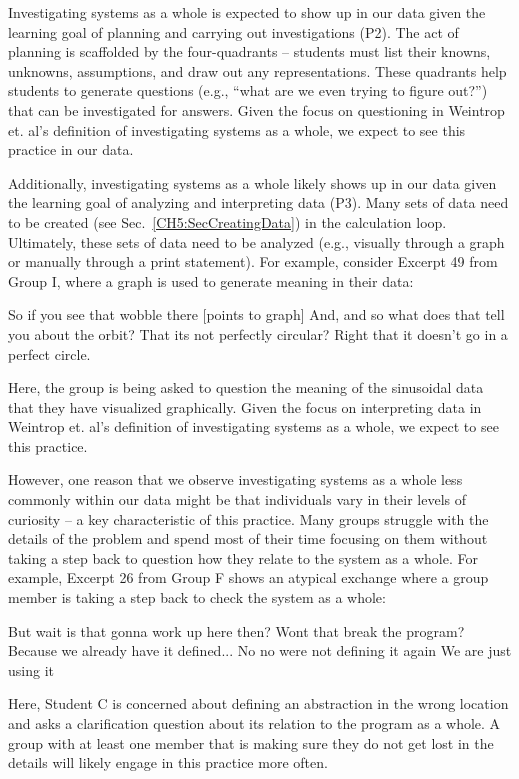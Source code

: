 \documentclass{msuphddissertation}
\begin{document}
\begin{doublespace}
Investigating systems as a whole is expected to show up in our data given the learning goal of planning and carrying out investigations (P2).  The act of planning is scaffolded by the four-quadrants -- students must list their knowns, unknowns, assumptions, and draw out any representations.  These quadrants help students to generate questions (e.g., ``what are we even trying to figure out?'') that can be investigated for answers.  Given the focus on questioning in Weintrop et. al's definition of investigating systems as a whole, we expect to see this practice in our data.

Additionally, investigating systems as a whole likely shows up in our data given the learning goal of analyzing and interpreting data (P3).  Many sets of data need to be created (see Sec.~\ref{CH5:SecCreatingData}) in the calculation loop.  Ultimately, these sets of data need to be analyzed (e.g., visually through a graph or manually through a print statement).  For example, consider Excerpt 49 from Group I, where a graph is used to generate meaning in their data:  \begin{description}
\TA So if you see that wobble there [points to graph]
\TA And, and so what does that tell you about the orbit?
\SB That its not perfectly circular?
\SC Right that it doesn't go in a perfect circle.
\end{description}  Here, the group is being asked to question the meaning of the sinusoidal data that they have visualized graphically.  Given the focus on interpreting data in Weintrop et. al's definition of investigating systems as a whole, we expect to see this practice.

However, one reason that we observe investigating systems as a whole less commonly within our data might be that individuals vary in their levels of curiosity -- a key characteristic of this practice.  Many groups struggle with the details of the problem and spend most of their time focusing on them without taking a step back to question how they relate to the system as a whole.  For example, Excerpt 26 from Group F shows an atypical exchange where a group member is taking a step back to check the system as a whole: \begin{description}
\SC But wait is that gonna work up here then?
\SC Wont that break the program?
\SC Because we already have it defined...
\SB No no were not defining it again
\SB We are just using it
\end{description}  Here, Student C is concerned about defining an abstraction in the wrong location and asks a clarification question about its relation to the program as a whole.  A group with at least one member that is making sure they do not get lost in the details will likely engage in this practice more often.  %


\end{doublespace}
\end{document}

